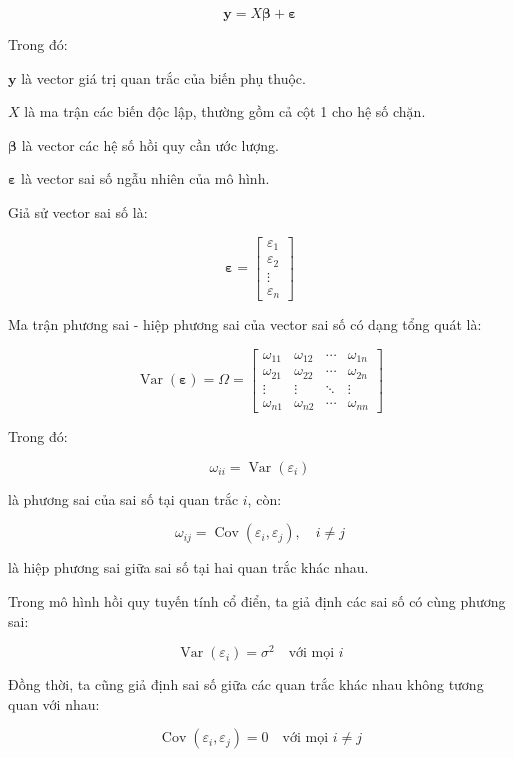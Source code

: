 \[
\mathbf{y} = X\boldsymbol{\beta} + \boldsymbol{\varepsilon}
\]

Trong đó:

\(\mathbf{y}\) là vector giá trị quan trắc của biến phụ thuộc.

\(X\) là ma trận các biến độc lập, thường gồm cả cột 1 cho hệ số chặn.

\(\boldsymbol{\beta}\) là vector các hệ số hồi quy cần ước lượng.

\(\boldsymbol{\varepsilon}\) là vector sai số ngẫu nhiên của mô hình.

Giả sử vector sai số là:

\[
\boldsymbol{\varepsilon}
=
\begin{bmatrix}
\varepsilon_1 \\
\varepsilon_2 \\
\vdots \\
\varepsilon_n
\end{bmatrix}
\]

Ma trận phương sai - hiệp phương sai của vector sai số có dạng tổng quát là:

\[
\operatorname{Var}(\boldsymbol{\varepsilon})
=
\Omega
=
\begin{bmatrix}
\omega_{11} & \omega_{12} & \cdots & \omega_{1n} \\
\omega_{21} & \omega_{22} & \cdots & \omega_{2n} \\
\vdots & \vdots & \ddots & \vdots \\
\omega_{n1} & \omega_{n2} & \cdots & \omega_{nn}
\end{bmatrix}
\]

Trong đó:

\[
\omega_{ii}
=
\operatorname{Var}(\varepsilon_i)
\]

là phương sai của sai số tại quan trắc \(i\), còn:

\[
\omega_{ij}
=
\operatorname{Cov}(\varepsilon_i,\varepsilon_j),
\quad i \neq j
\]

là hiệp phương sai giữa sai số tại hai quan trắc khác nhau.

Trong mô hình hồi quy tuyến tính cổ điển, ta giả định các sai số có cùng phương sai:

\[
\operatorname{Var}(\varepsilon_i)=\sigma^2
\quad \text{với mọi } i
\]

Đồng thời, ta cũng giả định sai số giữa các quan trắc khác nhau không tương quan với nhau:

\[
\operatorname{Cov}(\varepsilon_i,\varepsilon_j)=0
\quad \text{với mọi } i \neq j
\]

